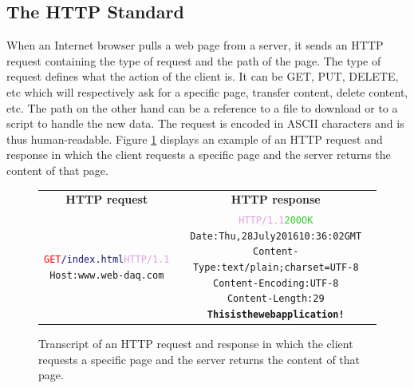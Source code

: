     \subsection{The HTTP Standard}

      When an Internet browser pulls a web page from a server, it sends an HTTP request containing the type of request and the path of the page. The type of request defines what the action of the client is. It can be GET, PUT, DELETE, etc which will respectively ask for a specific page, transfer content, delete content, etc. The path on the other hand can be a reference to a file to download or to a script to handle the new data. The request is encoded in ASCII characters and is thus human-readable. Figure \ref{fig:III-2-http} displays an example of an HTTP request and response in which the client requests a specific page and the server returns the content of that page. \\

      \begin{figure}[t!]
        \begin{tabularx}{\textwidth}{C{1}C{1}}
          \textbf{HTTP request} & \textbf{HTTP response} \\
        { \footnotesize
\begin{alltt}
\textcolor{Red}{GET} \textcolor{MidnightBlue}{/index.html} \textcolor{Plum}{HTTP/1.1} \newline
\textcolor{BurntOrange}{Host:} www.web-daq.com
\end{alltt} } & { \footnotesize
\begin{alltt}
\textcolor{Plum}{HTTP/1.1} \textcolor{LimeGreen}{200 OK} \newline
\textcolor{BurntOrange}{Date:} Thu, 28 July 2016 10:36:02 GMT \newline
\textcolor{BurntOrange}{Content-Type:} text/plain; charset=UTF-8 \newline
\textcolor{BurntOrange}{Content-Encoding:} UTF-8 \newline
\textcolor{BurntOrange}{Content-Length:} 29 \newline
\textbf{This is the web application !}
\end{alltt} }
        \end{tabularx}
        \caption{Transcript of an HTTP request and response in which the client requests a specific page and the server returns the content of that page.}
        \label{fig:III-2-http}
      \end{figure}

